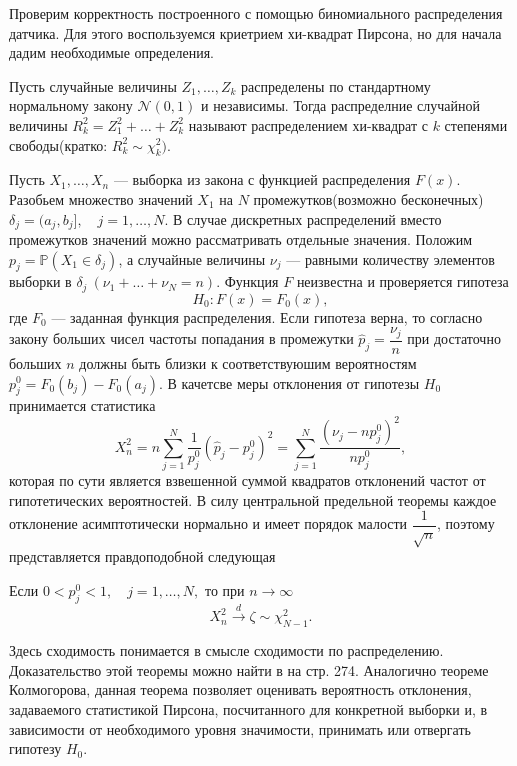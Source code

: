 Проверим корректность построенного с помощью биномиального распределения датчика.
 Для этого воспользуемся криетрием хи-квадрат Пирсона, но для начала дадим
 необходимые определения.
\begin{definition}
	Пусть случайные величины $ Z_1, \dots, Z_k $ распределены по стандартному
	 нормальному закону $ \mathcal{N}(0,1) $ и независимы. Тогда распределние
	 случайной величины $ R_k^2 = Z_1^2 + \dots + Z_k^2 $ называют распределением
	 хи-квадрат с $ k $ степенями свободы(кратко: $ R_k^2 \sim \chi_k^2) $. 
\end{definition}
Пусть $ X_1, \dots, X_n $ --- выборка из закона с функцией распределения $ F(x) $.
 Разобьем множество значений $ X_1 $ на $ N $ промежутков(возможно бесконечных)
 $ \delta_j = (a_j, b_j], \quad j = 1, \dots, N$. В случае дискретных распределений
 вместо промежутков значений можно рассматривать отдельные значения. 
 Положим $ p_j = \mathbb{P}(X_1 \in \delta_j) $, а случайные величины $ \nu_j $ ---
 равными количеству элементов выборки в $ \delta_j \ (\nu_1 + \dots + \nu_N = n) $.
 Функция $ F $ неизвестна и проверяется гипотеза
$$
 H_0: F(x) = F_0(x),
$$
 где $ F_0 $ --- заданная функция распределения. Если гипотеза верна, то согласно
 закону больших чисел частоты попадания в промежутки $ \hat{p}_j = \dfrac{\nu_j}{n} $
 при достаточно больших $ n $ должны быть близки к соответствуюшим вероятностям
 $ p_j^0 = F_0(b_j) - F_0(a_j) $. В качетсве меры отклонения от гипотезы $ H_0 $
 принимается статистика
$$
X_n^2 = n \sum_{j = 1}^N \frac{1}{p_j^0}(\hat{p}_j - p_j^0)^2 = \sum_{j = 1}^N
 \frac{(\nu_j - np_j^0)^2}{np_j^0},
$$
которая по сути является взвешенной суммой квадратов отклонений частот от
 гипотетических вероятностей. В силу центральной предельной теоремы
 каждое отклонение асимптотически нормально и имеет порядок малости
 $ \dfrac{1}{\sqrt{n}} $, поэтому представляется правдоподобной следующая
\begin{theorem}
	Если $ 0 < p_j^0 < 1, \quad j = 1, \dots, N,$ то при $ n \to \infty $
	$$
	X_n^2 \xrightarrow{d} \zeta \sim \chi_{N-1}^2.
	$$
\end{theorem}
Здесь сходимость понимается в смысле сходимости по распределению. Доказательство
 этой теоремы можно найти в \cite{lagutin_stat} на стр. 274. Аналогично теореме
 Колмогорова, данная теорема позволяет оценивать вероятность отклонения, задаваемого
 статистикой Пирсона, посчитанного для конкретной выборки и, в зависимости от
 необходимого уровня значимости, принимать или отвергать гипотезу $ H_0 $.